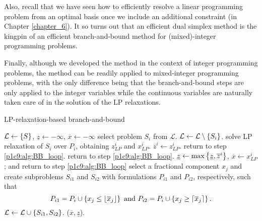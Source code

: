 Also, recall that we have seen how to efficiently resolve a linear programming problem from an optimal basis once we include an additional constraint (in Chapter \ref{chapter_6}). It so turns out that an efficient dual simplex method is the kingpin of an efficient branch-and-bound method for (mixed)-integer programming problems.

Finally, although we developed the method in the context of integer programming problems, the method can be readily applied to mixed-integer programming problems, with the only difference being that the branch-and-bound steps are only applied to the integer variables while the continuous variables are naturally taken care of in the solution of the LP relaxations.

\begin{algorithm}[h]
	\caption{LP-relaxation-based branch-and-bound} \label{p1c9:alg:BB}
	\begin{algorithmic}[1] %
		 $\mathcal{L} \gets \left\{ S \right \}$, $\underline{z} \gets -\infty$, $\overline{x} \gets -\infty$
		 \label{p1c9:alg:BB_loop}
		    \State select problem $S_i$ from $\mathcal{L}$. $\mathcal{L} \gets \mathcal{L}\setminus\left\{ S_i \right \}$. 
		    \State solve LP relaxation of $S_i$ over $P_i$, obtaining $z_{LP}^i$ and $x_{LP}^i$. $\overline{z}^i \gets z_{LP}^i$. 
		     return to step \ref{p1c9:alg:BB_loop}.
		     return to step \ref{p1c9:alg:BB_loop}.    
		     $\underline{z} \gets \max\left\{ \underline{z}, \overline{z}^i \right \}$, $\overline{x} \gets x_{LP}^i$; and return to step \ref{p1c9:alg:BB_loop}
		    \EndIf
		    \State select a fractional component $x_j$ and create subproblems $S_{i1}$ and $S_{i2}$ with formulations $P_{i1}$ and $P_{i2}$, respectively, such that 
		    \begin{equation*}
		    		P_{i1} = P_i \cup \left\{ x_j \leq \lfloor \overline{x}_j \rfloor \right \} \text{ and } P_{i2} = P_i \cup \left\{ x_j \geq \lceil \overline{x}_j \rceil \right \}.
		    \end{equation*}
		    \State $\mathcal{L} \gets \mathcal{L} \cup \left\{ S_{i1}, S_{i2} \right \}$.
		\EndWhile
		 ($\overline{x}, \underline{z}$).
	\end{algorithmic}
\end{algorithm}  

